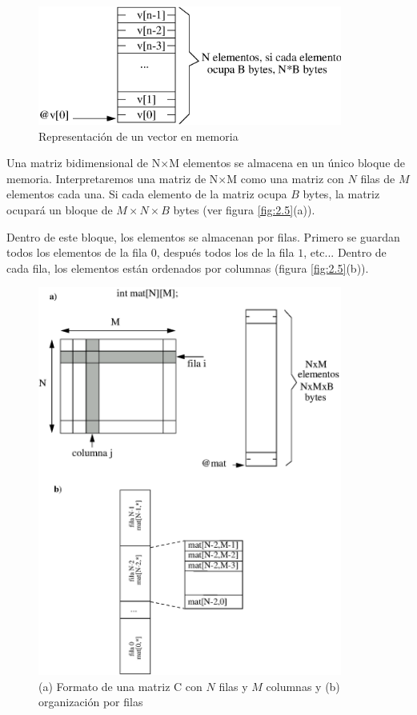 \begin{figure}[h]
  \centering
    \includegraphics[width=10cm]{graphs/2-3.eps}
  \caption{Representación de un vector en memoria}
  \label{fig:2.3}
\end{figure}


 Una matriz bidimensional de N$\times$M
elementos se almacena en un único bloque de memoria. Interpretaremos
una matriz de N$\times$M como una matriz con $N$ filas de $M$ elementos cada
una. Si cada elemento de la matriz ocupa $B$ bytes, la matriz ocupará un
bloque de  $M \times N \times B$ bytes (ver figura \ref{fig:2.5}(a)).

Dentro de este bloque, los elementos se almacenan por filas. Primero
se guardan todos los elementos de la fila $0$, después todos los de la
fila $1$, etc... Dentro de cada fila, los elementos están ordenados por
columnas (figura \ref{fig:2.5}(b)).


\begin{figure}[h]
  \centering
    \includegraphics[width=10cm]{graphs/2-5.eps}
  \caption{(a) Formato de una matriz  C con $N$ filas y $M$ columnas y (b)
organización por filas}
  \label{fig:2.3}
\end{figure}

